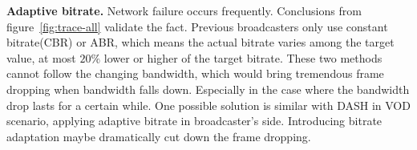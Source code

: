 \textbf{Adaptive bitrate.} Network failure occurs frequently. Conclusions from figure~\ref{fig:trace-all} validate the fact. Previous broadcasters only use constant bitrate(CBR) or ABR, which means the actual bitrate varies among the target value, at most $20\%$ lower or higher of the target bitrate. These two methods cannot follow the changing bandwidth, which would bring tremendous frame dropping when bandwidth falls down. Especially in the case where the bandwidth drop lasts for a certain while. One possible solution is similar with DASH in VOD scenario, applying adaptive bitrate in broadcaster's side. Introducing bitrate adaptation maybe dramatically cut down the frame dropping.

\iffalse
\begin{itemize}
\item If we can relax the dependency between frames, the solution space would be larger and more optimal solutions are expected to be found. That is, we can relax the decodability constraints to be $d_i = 1, \forall i$.

\item We can relax queue length constraint, i.e., making $T_1$ larger. This change similarly increases the space of possible solutions.

\item The frame drop strategy can be improved. That is, compared with the naive strategy in OBS (dropping all P/B when exceeding a threshold), selectively choosing frames to drop in IP would give a more optimal solution.
\end{itemize}
\fi


